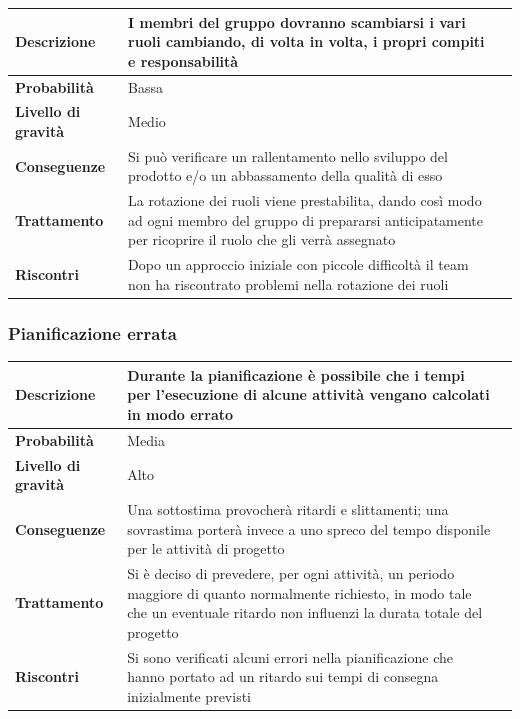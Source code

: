 \begin{center}
	
	\begin{tabular}{|>{\centering}m{4cm} ||>{\centering}m{8cm} |>{\centering\arraybackslash}m{0pt}@{}|}
		\hline
		\textbf{Descrizione} & I membri del gruppo dovranno scambiarsi i vari ruoli cambiando, di volta in volta, i propri compiti e responsabilità & \\[2ex]
		\hline	
		\textbf{Probabilità} & Bassa &\\[1ex]
		\hline
		\textbf{Livello di gravità} & Medio & \\[1ex]
		\hline
		\textbf{Conseguenze} & Si può verificare un rallentamento nello sviluppo del prodotto e/o un abbassamento della qualità di esso & \\[1ex]
		\hline
		\textbf{Trattamento} & La rotazione dei ruoli viene prestabilita, dando così modo ad ogni membro del gruppo di prepararsi anticipatamente per ricoprire il ruolo che gli verrà assegnato & \\[1ex] 
		\hline
		\textbf{Riscontri} & Dopo un approccio iniziale con piccole difficoltà il team non ha riscontrato problemi nella rotazione dei ruoli  & \\[1ex]
		\hline
	\end{tabular}
	
\end{center}
\newpage
\subsubsection{Pianificazione errata}

\begin{center}
	
	\begin{tabular}{|>{\centering}m{4cm} ||>{\centering}m{8cm} |>{\centering\arraybackslash}m{0pt}@{}|}
		\hline
		\textbf{Descrizione} & Durante la pianificazione è possibile che i tempi per l'esecuzione di alcune attività vengano calcolati in modo errato & \\[2ex]
		\hline	
		\textbf{Probabilità} & Media &\\[1ex]
		\hline
		\textbf{Livello di gravità} & Alto & \\[1ex]
		\hline
		\textbf{Conseguenze} & Una sottostima provocherà ritardi e slittamenti; una sovrastima porterà invece a uno spreco del tempo disponile per le attività di progetto & \\[1ex]
		\hline
		\textbf{Trattamento} & Si è deciso di prevedere, per ogni attività, un periodo maggiore di quanto normalmente richiesto, in modo tale che un eventuale ritardo non influenzi la durata totale del progetto & \\[1ex] 
		\hline
		\textbf{Riscontri} & Si sono verificati alcuni errori nella pianificazione che hanno portato ad un ritardo sui tempi di consegna inizialmente previsti & \\[1ex]
		\hline
	\end{tabular}
	
\end{center}

